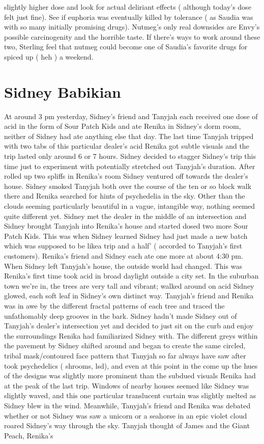 \documentclass[12pt]{book}
\begin{document}
slightly higher dose and look for actual deliriant effects ( although today's dose felt just fine). See if euphoria was eventually killed by tolerance ( as Saudia was with so many initially promising drugs). Nutmeg's only real downsides are Envy's possible carcinogenity and the horrible taste. If there's ways to work around these two, Sterling feel that nutmeg could become one of Saudia's favorite drugs for spiced up ( heh ) a weekend.



\chapter{Sidney Babikian}

At around 3 pm yesterday, Sidney's friend and Tanyjah each received one dose of acid in the form of Sour Patch Kids and ate Renika in Sidney's dorm room, neither of Sidney had ate anything else that day. The last time Tanyjah tripped with two tabs of this particular dealer's acid Renika got subtle visuals and the trip lasted only around 6 or 7 hours. Sidney decided to stagger Sidney's trip this time just to experiment with potentially stretched out Tanyjah's duration. After rolled up two spliffs in Renika's room Sidney ventured off towards the dealer's house. Sidney smoked Tanyjah both over the course of the ten or so block walk there and Renika searched for hints of psychedelia in the sky. Other than the clouds seeming particularly beautiful in a vague, intangible way, nothing seemed quite different yet. Sidney met the dealer in the middle of an intersection and Sidney brought Tanyjah into Renika's house and started dosed two more Sour Patch Kids. This was when Sidney learned Sidney had just made a new batch which was supposed to be likea trip and a half' ( accorded to Tanyjah's first customers). Renika's friend and Sidney each ate one more at about 4:30 pm. When Sidney left Tanyjah's house, the outside world had changed. This was Renika's first time took acid in broad daylight outside a city set. In the suburban town we're in, the trees are very tall and vibrant; walked around on acid Sidney glowed, each soft leaf in Sidney's own distinct way. Tanyjah's friend and Renika was in awe by the different fractal patterns of each tree and traced the unfathomably deep grooves in the bark. Sidney hadn't made Sidney out of Tanyjah's dealer's intersection yet and decided to just sit on the curb and enjoy the surroundings Renika had familiarized Sidney with. The different greys within the pavement by Sidney shifted around and began to create the same circled, tribal mask/contoured face pattern that Tanyjah so far always have saw after took psychedelics ( shrooms, lsd), and even at this point in the come up the hues of the designs was slightly more prominent than the subdued visuals Renika had at the peak of the last trip. Windows of nearby houses seemed like Sidney was slightly waved, and this one particular translucent curtain was slightly melted as Sidney blew in the wind. Meanwhile, Tanyjah's friend and Renika was debated whether or not Sidney was saw a unicorn or a seahorse in an epic violet cloud roared Sidney's way through the sky. Tanyjah thought of James and the Giant Peach, Renika's 
\end{document}
